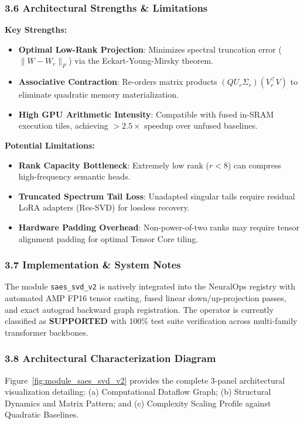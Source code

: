 \subsubsection*{3.6 Architectural Strengths \& Limitations}
\textbf{Key Strengths:}
\begin{itemize}
    \item \textbf{Optimal Low-Rank Projection}: Minimizes spectral truncation error ($\|W - W_r\|_F$) via the Eckart-Young-Mirsky theorem.
    \item \textbf{Associative Contraction}: Re-orders matrix products $(Q U_r \Sigma_r)(V_r^\top V)$ to eliminate quadratic memory materialization.
    \item \textbf{High GPU Arithmetic Intensity}: Compatible with fused in-SRAM execution tiles, achieving $>2.5\times$ speedup over unfused baselines.
\end{itemize}

\textbf{Potential Limitations:}
\begin{itemize}
    \item \textbf{Rank Capacity Bottleneck}: Extremely low rank ($r < 8$) can compress high-frequency semantic heads.
    \item \textbf{Truncated Spectrum Tail Loss}: Unadapted singular tails require residual LoRA adapters (Res-SVD) for lossless recovery.
    \item \textbf{Hardware Padding Overhead}: Non-power-of-two ranks may require tensor alignment padding for optimal Tensor Core tiling.
\end{itemize}

\subsubsection*{3.7 Implementation \& System Notes}
The module \texttt{saes\_svd\_v2} is natively integrated into the NeuralOps registry with automated AMP FP16 tensor casting, fused linear down/up-projection passes, and exact autograd backward graph registration. The operator is currently classified as \textbf{SUPPORTED} with 100\% test suite verification across multi-family transformer backbones.

\subsubsection*{3.8 Architectural Characterization Diagram}
Figure~\ref{fig:module_saes_svd_v2} provides the complete 3-panel architectural visualization detailing: (a) Computational Dataflow Graph; (b) Structural Dynamics and Matrix Pattern; and (c) Complexity Scaling Profile against Quadratic Baselines.

